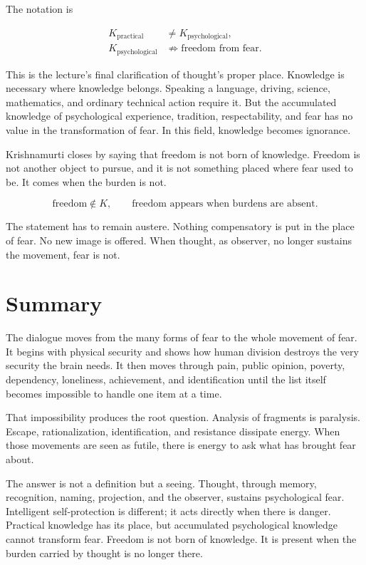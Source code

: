 The notation is

\begin{align}
K_{\mathrm{practical}} &\neq K_{\mathrm{psychological}}, \\
K_{\mathrm{psychological}} &\not\Rightarrow \text{freedom from fear}.
\end{align}

This is the lecture's final clarification of thought's proper place. Knowledge is necessary where knowledge belongs. Speaking a language, driving, science, mathematics, and ordinary technical action require it. But the accumulated knowledge of psychological experience, tradition, respectability, and fear has no value in the transformation of fear. In this field, knowledge becomes ignorance.

Krishnamurti closes by saying that freedom is not born of knowledge. Freedom is not another object to pursue, and it is not something placed where fear used to be. It comes when the burden is not.

\begin{equation}
\text{freedom} \notin K,
\qquad
\text{freedom appears when burdens are absent}.
\end{equation}

The statement has to remain austere. Nothing compensatory is put in the place of fear. No new image is offered. When thought, as observer, no longer sustains the movement, fear is not.

\section{Summary}

The dialogue moves from the many forms of fear to the whole movement of fear. It begins with physical security and shows how human division destroys the very security the brain needs. It then moves through pain, public opinion, poverty, dependency, loneliness, achievement, and identification until the list itself becomes impossible to handle one item at a time.

That impossibility produces the root question. Analysis of fragments is paralysis. Escape, rationalization, identification, and resistance dissipate energy. When those movements are seen as futile, there is energy to ask what has brought fear about.

The answer is not a definition but a seeing. Thought, through memory, recognition, naming, projection, and the observer, sustains psychological fear. Intelligent self-protection is different; it acts directly when there is danger. Practical knowledge has its place, but accumulated psychological knowledge cannot transform fear. Freedom is not born of knowledge. It is present when the burden carried by thought is no longer there.